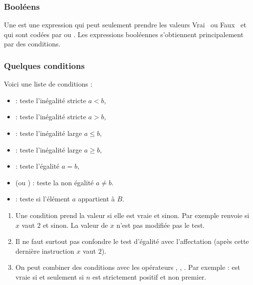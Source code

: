 \documentclass[class=report,crop=false]{standalone}
\begin{document}
\subsubsection*{Booléens}

Une  est une expression
qui peut seulement prendre les valeurs  \og Vrai \fg\
ou \og Faux \fg\ et qui sont codées par 
ou .
Les expressions booléennes s'obtiennent 
principalement par des conditions.

\subsubsection*{Quelques conditions}

Voici une liste de conditions :
\begin{itemize}
  \item {} : teste l'inégalité stricte $a<b$,
  \item {} : teste l'inégalité stricte $a>b$,
  \item {} : teste l'inégalité large $a\le b$,
  \item {} : teste l'inégalité large $a\ge b$,
  \item {} : teste l'égalité $a=b$,
  \item {} (ou ) : teste la non égalité $a\neq b$.
  \item \codeinline{a in B} : teste si l'élément $a$ appartient à $B$.
\end{itemize}



\begin{remarque*}

\begin{enumerate}
  \item Une condition prend la valeur  si elle est vraie et  sinon.
Par exemple \codeinline{x == 2} renvoie \codeinline{True} si $x$ vaut $2$ et \codeinline{False} sinon.
La valeur de $x$ n'est pas modifiée pas le test.
  
  \item Il ne faut surtout pas confondre le test d'égalité
 avec l'affectation  (après cette dernière instruction 
$x$ vaut $2$).
  
  \item On peut combiner des conditions avec les opérateurs ,
  \codeinline{or}, \codeinline{not}. Par exemple :
   est vraie
  si et seulement si $n$ est strictement positif et non premier.
  
\end{enumerate}  
\end{remarque*}
\end{document}
